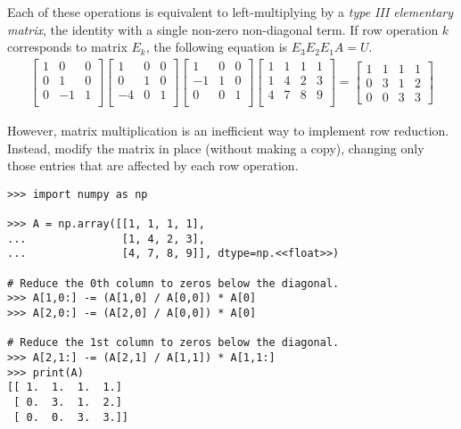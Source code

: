 Each of these operations is equivalent to left-multiplying by a \emph{type III elementary matrix}, the identity with a single non-zero non-diagonal term.
If row operation $k$ corresponds to matrix $E_k$, the following equation is $E_3E_2E_1A = U$.
%
\begin{align*}
\left[\begin{array}{ccc}
1 & 0 & 0 \\
0 & 1 & 0 \\
0 & -1 & 1 \\
\end{array}\right]
\left[\begin{array}{ccc}
1 & 0 & 0 \\
0 & 1 & 0 \\
-4 & 0 & 1 \\
\end{array}\right]
\left[\begin{array}{ccc}
1 & 0 & 0 \\
-1 & 1 & 0 \\
0 & 0 & 1 \\
\end{array}\right]
\left[\begin{array}{ccc|c}
1 & 1 & 1 & 1 \\
1 & 4 & 2 & 3 \\
4 & 7 & 8 & 9 \\
\end{array}\right]
=
\left[\begin{array}{ccc|c}
1 & 1 & 1 & 1 \\
0 & 3 & 1 & 2 \\
0 & 0 & 3 & 3
\end{array}\right]
\end{align*}

However, matrix multiplication is an inefficient way to implement row reduction.
Instead, modify the matrix in place (without making a copy), changing only those entries that are affected by each row operation.

\begin{lstlisting}
>>> import numpy as np

>>> A = np.array([[1, 1, 1, 1],
...               [1, 4, 2, 3],
...               [4, 7, 8, 9]], dtype=np.<<float>>)

# Reduce the 0th column to zeros below the diagonal.
>>> A[1,0:] -= (A[1,0] / A[0,0]) * A[0]
>>> A[2,0:] -= (A[2,0] / A[0,0]) * A[0]

# Reduce the 1st column to zeros below the diagonal.
>>> A[2,1:] -= (A[2,1] / A[1,1]) * A[1,1:]
>>> print(A)
[[ 1.  1.  1.  1.]
 [ 0.  3.  1.  2.]
 [ 0.  0.  3.  3.]]
\end{lstlisting}

